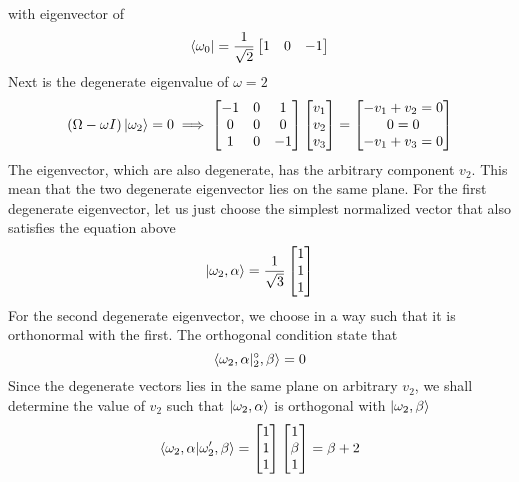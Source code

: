 \documentclass[../../../main.tex]{subfiles}
\begin{document}
with eigenvector of
\begin{equation*}
	\bra{\omega_0}=\frac{1}{\sqrt{2}}
	\begin{bmatrix}
		1 & 0 & -1
	\end{bmatrix}
\end{equation*}
Next is the degenerate eigenvalue of $\omega=2$
\begin{equation*}
	(\Omega-\omega I)\ket{\omega_2}=0\implies
	\begin{bmatrix}
		-1 & 0 & 1  \\
		0  & 0 & 0  \\
		1  & 0 & -1 \\
	\end{bmatrix}
	\begin{bmatrix}
		v_1 \\
		v_2 \\
		v_3 \\
	\end{bmatrix}
	=
	\begin{bmatrix}
		-v_1+v_2=0 \\
		0=0        \\
		-v_1+v_3=0 \\
	\end{bmatrix}
\end{equation*}
The eigenvector, which are also degenerate, has the arbitrary component $v_2$.
This mean that the two degenerate eigenvector lies on the same plane.
For the first degenerate eigenvector, let us just choose the simplest normalized vector that also satisfies the equation above
\begin{equation*}
	\ket{\omega_2,\alpha}=\frac{1}{\sqrt{3}}
	\begin{bmatrix}
		1 \\
		1 \\
		1 \\
	\end{bmatrix}
\end{equation*}
For the second degenerate eigenvector, we choose in a way such that it is orthonormal with the first.
The orthogonal condition state that
\begin{equation*}
	\braket{\omega_2,\alpha|^\circ_2, \beta}=0
\end{equation*}
Since the degenerate vectors lies in the same plane on arbitrary $v_2$, we shall determine the value of $v_2$ such that $\ket{\omega_2,\alpha}$ is orthogonal with $\ket{\omega_2,\beta}$
\begin{equation*}
	\braket{\omega_2,\alpha|\omega_2', \beta}=
	\begin{bmatrix}
		1 \\1\\1
	\end{bmatrix}
	\begin{bmatrix}
		1     \\
		\beta \\
		1     \\
	\end{bmatrix}
	=\beta+2
\end{equation*}
\end{document}
